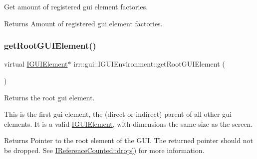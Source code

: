 Get amount of registered gui element factories. 

\begin{DoxyReturn}{Returns}
Amount of registered gui element factories. 
\end{DoxyReturn}
\mbox{\label{classirr_1_1gui_1_1IGUIEnvironment_a35fec6d5baa9b2f65aa9ee2c336104d4}} 
\subsubsection{\texorpdfstring{get\+Root\+G\+U\+I\+Element()}{getRootGUIElement()}\hspace{0.1cm}{\footnotesize\ttfamily [1/2]}}
{\footnotesize\ttfamily virtual \hyperlink{classirr_1_1gui_1_1IGUIElement}{I\+G\+U\+I\+Element}$\ast$ irr\+::gui\+::\+I\+G\+U\+I\+Environment\+::get\+Root\+G\+U\+I\+Element (\begin{DoxyParamCaption}{ }\end{DoxyParamCaption})\hspace{0.3cm}{\ttfamily [pure virtual]}}



Returns the root gui element. 

This is the first gui element, the (direct or indirect) parent of all other gui elements. It is a valid \hyperlink{classirr_1_1gui_1_1IGUIElement}{I\+G\+U\+I\+Element}, with dimensions the same size as the screen. \begin{DoxyReturn}{Returns}
Pointer to the root element of the G\+UI. The returned pointer should not be dropped. See \hyperlink{classirr_1_1IReferenceCounted_a03856a09355b89d178090c4a5f738543}{I\+Reference\+Counted\+::drop()} for more information. 
\end{DoxyReturn}
\mbox{\label{classirr_1_1gui_1_1IGUIEnvironment_a35fec6d5baa9b2f65aa9ee2c336104d4}} 
